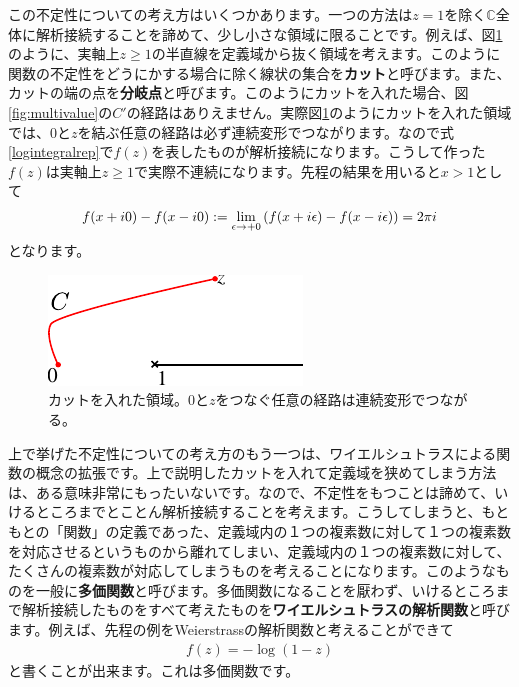\documentclass[report,paper=a4, fontsize=12pt, line_length=16cm, number_of_lines=33,dvipdfmx]{jlreq}
\numberwithin{equation}{section}
\newcommand{\Cb}{\mathbb{C}}
\newcommand{\strong}[1]{\textsf{\bfseries #1}}
\begin{document}
この不定性についての考え方はいくつかあります。一つの方法は$z=1$を除く$\Cb$全体に解析接続することを諦めて、少し小さな領域に限ることです。例えば、図\ref{fig:cut}のように、実軸上$z\ge 1$の半直線を定義域から抜く領域を考えます。このように関数の不定性をどうにかする場合に除く線状の集合を\strong{カット}と呼びます。また、カットの端の点を\strong{分岐点}と呼びます。このようにカットを入れた場合、図\ref{fig:multivalue}の$C'$の経路はありえません。実際図\ref{fig:cut}のようにカットを入れた領域では、$0$と$z$を結ぶ任意の経路は必ず連続変形でつながります。なので式\eqref{logintegralrep}で$f(z)$を表したものが解析接続になります。こうして作った$f(z)$は実軸上$z\ge 1$で実際不連続になります。先程の結果を用いると$x>1$として
\begin{align}
  f(x+i0)-f(x-i0):=\lim_{\epsilon\to +0}\qty(
    f(x+i\epsilon)-f(x-i\epsilon)
  )=2\pi i
\end{align}
となります。
\begin{figure}[htbp]
  \centering
  \includegraphics{cut.pdf}
  \caption{カットを入れた領域。$0$と$z$をつなぐ任意の経路は連続変形でつながる。}
  \label{fig:cut}
\end{figure}

上で挙げた不定性についての考え方のもう一つは、ワイエルシュトラスによる関数の概念の拡張です。上で説明したカットを入れて定義域を狭めてしまう方法は、ある意味非常にもったいないです。なので、不定性をもつことは諦めて、いけるところまでとことん解析接続することを考えます。こうしてしまうと、もともとの「関数」の定義であった、定義域内の１つの複素数に対して１つの複素数を対応させるというものから離れてしまい、定義域内の１つの複素数に対して、たくさんの複素数が対応してしまうものを考えることになります。このようなものを一般に\strong{多価関数}と呼びます。多価関数になることを厭わず、いけるところまで解析接続したものをすべて考えたものを\strong{ワイエルシュトラスの解析関数}と呼びます。例えば、先程の例をWeierstrassの解析関数と考えることができて
\begin{align}
  f(z)=-\log(1-z)
\end{align}
と書くことが出来ます。これは多価関数です。
\end{document}

